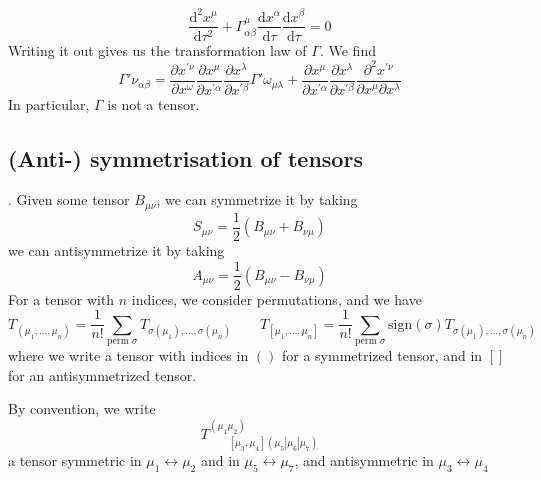 \documentclass[a4paper]{book}
\theoremstyle{definition}
\theoremstyle{remark}
\begin{document}
\begin{enumerate}
    \begin{equation}
        \frac{\text{d}^2x^\mu}{\text{d}\tau^2} + \Gamma^\mu_{\alpha\beta} \frac{\text{d}x^\alpha}{\text{d}\tau}\frac{\text{d}x^\beta}{\text{d}\tau} = 0
    \end{equation}
    Writing it out gives us the transformation law of $\Gamma$. We find 
    \begin{equation}
        \Gamma{'\nu}_{\alpha\beta} = \frac{\partial x^{'\nu}}{\partial x^{\omega}}\frac{\partial x^{\mu}}{\partial x^{'\alpha}}\frac{\partial x^{\lambda}}{\partial x^{'\beta}}\Gamma{'\omega}_{\mu\lambda} + \frac{\partial x^{\mu}}{\partial x^{'\alpha}}\frac{\partial x^{\lambda}}{\partial x^{'\beta}} \frac{\partial^2 x^{'\nu}}{\partial x^\mu \partial x^{\lambda}}
    \end{equation}
    In particular, $\Gamma$ is not a tensor. 
\end{enumerate}

\subsection{(Anti-) symmetrisation of tensors}. \newline 
Given some tensor $B_{\mu\nu}$, we can symmetrize it by taking 
\begin{equation}
    S_{\mu\nu} = \frac{1}{2}(B_{\mu\nu} + B_{\nu\mu})
\end{equation}
we can antisymmetrize it by taking 
\begin{equation}
    A_{\mu\nu} = \frac{1}{2}(B_{\mu\nu} - B_{\nu\mu})
\end{equation}
For a tensor with $n$ indices, we consider permutations, and we have 
\begin{equation}
    T_{(\mu_1, \dots, \mu_n)} = \frac{1}{n!}\sum_{\text{perm }\sigma} T_{\sigma(\mu_1), \dots, \sigma(\mu_n)} \qquad T_{[\mu_1, \dots, \mu_n]} = \frac{1}{n!}\sum_{\text{perm }\sigma} \text{sign}(\sigma) T_{\sigma(\mu_1), \dots, \sigma(\mu_n)} \qquad 
\end{equation}
where we write a tensor with indices in $()$ for a symmetrized tensor, and in $[]$ for an antisymmetrized tensor. \par \medskip 

By convention, we write 
\begin{equation}
    T^{(\mu_1 \mu_2)}_{\qquad[\mu_3, \mu_4](\mu_5|\mu_6|\mu_7)}
\end{equation}
a tensor symmetric in $\mu_1 \leftrightarrow \mu_2$ and in $\mu_5 \leftrightarrow \mu_7$, and antisymmetric in $\mu_3 \leftrightarrow \mu_4$ \par \bigskip 
\end{document}
